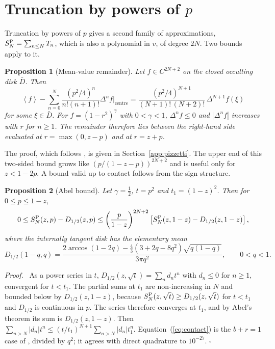 \documentclass[11pt]{article}
\newtheorem{proposition}{Proposition}
\newenvironment{proof}{\par\noindent\textit{Proof.}\ }{\hfill$\square$\par\medskip}
\newcommand{\avg}[1]{\left\langle #1 \right\rangle}
\begin{document}
\section{Truncation by powers of $p$} \label{app:meanvalue}

Truncation by powers of $p$ gives a second family of approximations, $S^{\rm P}_N=\sum_{n\le N}T_n$, which is also a polynomial in $v$, of degree $2N$. Two bounds apply to it.

\begin{proposition}[Mean-value remainder] \label{prop:lagrange}
Let $f\in C^{2N+2}$ on the closed occulting disk $\bar D$. Then
\begin{equation}
\avg{f}-\sum_{n=0}^{N}\frac{(p^2/4)^n}{n!(n+1)!}\Delta^nf\big|_{\mathrm{centre}}=\frac{(p^2/4)^{N+1}}{(N+1)!\,(N+2)!}\,\Delta^{N+1}f(\xi) \label{eq:lagrange}
\end{equation}
for some $\xi\in\bar D$. For $f=(1-r^2)^\gamma$ with $0<\gamma<1$, $\Delta^{n}f\le0$ and $|\Delta^nf|$ increases with $r$ for $n\ge1$. The remainder therefore lies between the right-hand side evaluated at $r=\max(0,z-p)$ and at $r=z+p$.
\end{proposition}

The proof, which follows \citet{Pizzetti1909}, is given in Section~\ref{app:pizzetti}. The upper end of this two-sided bound grows like $(p/(1-z-p))^{2N+2}$ and is useful only for $z<1-2p$. A bound valid up to contact follows from the sign structure.

\begin{proposition}[Abel bound] \label{prop:abel}
Let $\gamma=\tfrac12$, $t=p^2$ and $t_1=(1-z)^2$. Then for $0\le p\le 1-z$,
\begin{equation}
0\le S^{\rm P}_N(z,p)-D_{1/2}(z,p)\le\left(\frac{p}{1-z}\right)^{2N+2}\left[S^{\rm P}_N(z,1-z)-D_{1/2}(z,1-z)\right], \label{eq:abel}
\end{equation}
where the internally tangent disk has the elementary mean
\begin{equation}
D_{1/2}(1-q,q)=\frac{2\arccos(1-2q)-\tfrac43(3+2q-8q^2)\sqrt{q(1-q)}}{3\pi q^2},\qquad 0<q<1 . \label{eq:contact}
\end{equation}
\end{proposition}

\begin{proof}
As a power series in $t$, $D_{1/2}(z,\sqrt t)=\sum_n d_n t^n$ with $d_n\le0$ for $n\ge1$, convergent for $t<t_1$. The partial sums at $t_1$ are non-increasing in $N$ and bounded below by $D_{1/2}(z,1-z)$, because $S^{\rm P}_N(z,\sqrt t)\ge D_{1/2}(z,\sqrt t)$ for $t<t_1$ and $D_{1/2}$ is continuous in $p$. The series therefore converges at $t_1$, and by Abel's theorem its sum is $D_{1/2}(z,1-z)$. Then $\sum_{n>N}|d_n|t^n\le(t/t_1)^{N+1}\sum_{n>N}|d_n|t_1^n$. Equation~(\ref{eq:contact}) is the $b+r=1$ case of \citet{Agol2020}, divided by $q^2$; it agrees with direct quadrature to $10^{-27}$.
\end{proof}
\end{document}
